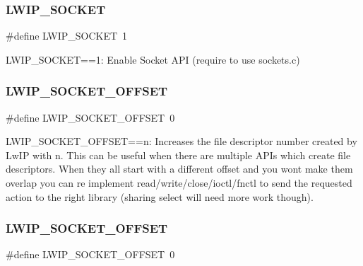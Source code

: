 \subsubsection{\texorpdfstring{L\+W\+I\+P\+\_\+\+S\+O\+C\+K\+ET}{LWIP\_SOCKET}\hspace{0.1cm}{\footnotesize\ttfamily [2/2]}}
{\footnotesize\ttfamily \#define L\+W\+I\+P\+\_\+\+S\+O\+C\+K\+ET~1}

L\+W\+I\+P\+\_\+\+S\+O\+C\+K\+ET==1\+: Enable Socket A\+PI (require to use sockets.\+c) \mbox{\label{group__lwip__opts__socket_gad0197c845fbb44c920b272f0fef3b57e}} 
\subsubsection{\texorpdfstring{L\+W\+I\+P\+\_\+\+S\+O\+C\+K\+E\+T\+\_\+\+O\+F\+F\+S\+ET}{LWIP\_SOCKET\_OFFSET}\hspace{0.1cm}{\footnotesize\ttfamily [1/2]}}
{\footnotesize\ttfamily \#define L\+W\+I\+P\+\_\+\+S\+O\+C\+K\+E\+T\+\_\+\+O\+F\+F\+S\+ET~0}

L\+W\+I\+P\+\_\+\+S\+O\+C\+K\+E\+T\+\_\+\+O\+F\+F\+S\+ET==n\+: Increases the file descriptor number created by Lw\+IP with n. This can be useful when there are multiple A\+P\+Is which create file descriptors. When they all start with a different offset and you won\textquotesingle{}t make them overlap you can re implement read/write/close/ioctl/fnctl to send the requested action to the right library (sharing select will need more work though). \mbox{\label{group__lwip__opts__socket_gad0197c845fbb44c920b272f0fef3b57e}} 
\subsubsection{\texorpdfstring{L\+W\+I\+P\+\_\+\+S\+O\+C\+K\+E\+T\+\_\+\+O\+F\+F\+S\+ET}{LWIP\_SOCKET\_OFFSET}\hspace{0.1cm}{\footnotesize\ttfamily [2/2]}}
{\footnotesize\ttfamily \#define L\+W\+I\+P\+\_\+\+S\+O\+C\+K\+E\+T\+\_\+\+O\+F\+F\+S\+ET~0}

